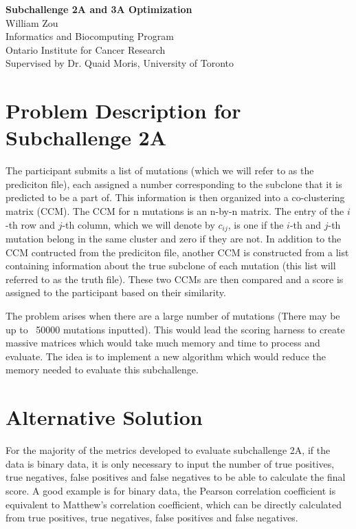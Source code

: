 \documentclass[a4paper, 11pt]{article}
\begin{document}
\noindent
\large\textbf{Subchallenge 2A and 3A Optimization} \\
\normalsize William Zou \\ 
Informatics and Biocomputing Program \\
Ontario Institute for Cancer Research \\
Supervised by Dr. Quaid Moris, University of Toronto \\

\justify
\section*{Problem Description for Subchallenge 2A}
The participant submits a list of mutations (which we will refer to as the prediciton file), each assigned a number corresponding to the subclone that it is predicted to be a part of. This information is then organized into a co-clustering matrix (CCM). The CCM for n mutations is an n-by-n matrix. The entry of the $i$-th row and $j$-th column, which we will denote by $c_{ij}$, is one if the $i$-th and $j$-th mutation belong in the same cluster and zero if they are not. In addition to the CCM contructed from the prediciton file, another CCM is constructed from a list containing information about the true subclone of each mutation (this list will referred to as the truth file). These two CCMs are then compared and a score is assigned to the participant based on their similarity.  

The problem arises when there are a large number of mutations (There may be up to ~50000 mutations inputted). This would lead the scoring harness to create massive matrices which would take much memory and time to process and evaluate. The idea is to implement a new algorithm which would reduce the memory needed to evaluate this subchallenge.

\section*{Alternative Solution}
For the majority of the metrics developed to evaluate subchallenge 2A, if the data is binary data, it is only necessary to input the number of true positives, true negatives, false positives and false negatives to be able to calculate the final score. A good example is for binary data, the Pearson correlation coefficient is equivalent to Matthew's correlation coefficient, which can be directly calculated from true positives, true negatives, false positives and false negatives. 
\end{document}

